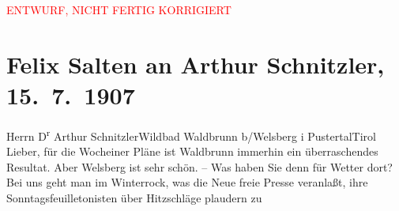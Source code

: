 
\begin{center}
            \textcolor{red}{ENTWURF, NICHT FERTIG KORRIGIERT}
                      \end{center}
            
         
         \renewcommand{\erwaehntePersonen}{Personen: Richard Beer-Hofmann, Alois Hofmann, Gustav Mahler, Maria Anna Mahler, Ottilie Salten, Michael Emil Salzmann}
         \renewcommand{\erwaehnteInstitutionen}{Institutionen: Neue Freie Presse}
         \renewcommand{\erwaehnteOrte}{Orte: Edlach, Südtirol, Welsberg-Taisten, Wien, Wildbad Waldbrunn, Wocheiner See, XIX., Döbling}
         \renewcommand{\erwaehnteWerke}{Werke: Kindertotenlieder}
               \section[Felix Salten an Arthur Schnitzler, 15. 7. 1907]{ Felix Salten an Arthur Schnitzler, 15. 7. 1907}\nopagebreak{}\rehead{ }\begin{ledgroupsized}[t]{13cm}\normalsize\beginnumbering \toendnotes[C]{\smallbreak\pagebreak[2]} 
\toendnotes[C]{\smallbreak}\pstart{}{\pb}Herrn D\textsuperscript{r} Arthur Schnitzler\pend{}\pstart{}Wildbad Waldbrunn
                  b/Welsberg i Pustertal\pend{}\pstart{}Tirol\pend{}{\bigskip}\pstart
           \noindent{}{\pb}Lieber, für die Wocheiner Pläne ist Waldbrunn immerhin ein überraschendes Resultat.
               Aber Welsberg ist sehr schön. – Was haben Sie denn für
               Wetter dort? Bei uns geht man im Winterrock, was die Neue freie
                  Presse veranlaßt, ihre Sonntagsfeuilletonisten über Hitzschläge plaudern zu

\end{ledgroupsized}
